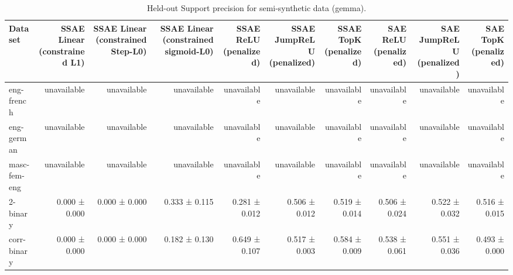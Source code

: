 \begin{table}[t]
\centering
\caption{Held-out Support precision for semi-synthetic data (gemma).}
\label{tab:semisynthetic-gemma-support-precision}
\begin{tabular}{lrrrrrrrrr}
\toprule
Dataset & SSAE Linear (constrained L1) & SSAE Linear (constrained Step-L0) & SSAE Linear (constrained sigmoid-L0) & SSAE ReLU (penalized) & SSAE JumpReLU (penalized) & SSAE TopK (penalized) & SAE ReLU (penalized) & SAE JumpReLU (penalized) & SAE TopK (penalized) \\
\midrule
eng-french & unavailable & unavailable & unavailable & unavailable & unavailable & unavailable & unavailable & unavailable & unavailable \\
eng-german & unavailable & unavailable & unavailable & unavailable & unavailable & unavailable & unavailable & unavailable & unavailable \\
masc-fem-eng & unavailable & unavailable & unavailable & unavailable & unavailable & unavailable & unavailable & unavailable & unavailable \\
2-binary & 0.000 ± 0.000 & 0.000 ± 0.000 & 0.333 ± 0.115 & 0.281 ± 0.012 & 0.506 ± 0.012 & 0.519 ± 0.014 & 0.506 ± 0.024 & 0.522 ± 0.032 & 0.516 ± 0.015 \\
corr-binary & 0.000 ± 0.000 & 0.000 ± 0.000 & 0.182 ± 0.130 & 0.649 ± 0.107 & 0.517 ± 0.003 & 0.584 ± 0.009 & 0.538 ± 0.061 & 0.551 ± 0.036 & 0.493 ± 0.000 \\
\bottomrule
\end{tabular}
\end{table}
